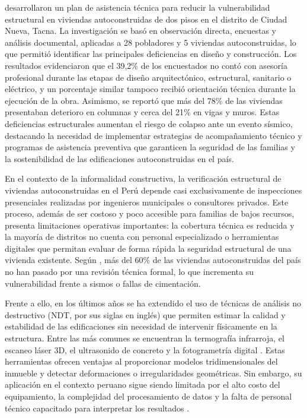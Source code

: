 \documentclass[12pt,oneside]{report}
\begin{document}
\citet{flores2024} desarrollaron un plan de asistencia técnica para reducir la vulnerabilidad estructural en viviendas autoconstruidas de dos pisos en el distrito de Ciudad Nueva, Tacna. La investigación se basó en observación directa, encuestas y análisis documental, aplicadas a 28 pobladores y 5 viviendas autoconstruidas, lo que permitió identificar las principales deficiencias en diseño y construcción. Los resultados evidenciaron que el 39,2\% de los encuestados no contó con asesoría profesional durante las etapas de diseño arquitectónico, estructural, sanitario o eléctrico, y un porcentaje similar tampoco recibió orientación técnica durante la ejecución de la obra. Asimismo, se reportó que más del 78\% de las viviendas presentaban deterioro en columnas y cerca del 21\% en vigas y muros. Estas deficiencias estructurales aumentan el riesgo de colapso ante un evento sísmico, destacando la necesidad de implementar estrategias de acompañamiento técnico y programas de asistencia preventiva que garanticen la seguridad de las familias y la sostenibilidad de las edificaciones autoconstruidas en el país.\par

En el contexto de la informalidad constructiva, la verificación estructural de viviendas autoconstruidas en el Perú depende casi exclusivamente de inspecciones presenciales realizadas por ingenieros municipales o consultores privados. Este proceso, además de ser costoso y poco accesible para familias de bajos recursos, presenta limitaciones operativas importantes: la cobertura técnica es reducida y la mayoría de distritos no cuenta con personal especializado o herramientas digitales que permitan evaluar de forma rápida la seguridad estructural de una vivienda existente. Según \citet{sencico2023}, más del 60\% de las viviendas autoconstruidas del país no han pasado por una revisión técnica formal, lo que incrementa su vulnerabilidad frente a sismos o fallas de cimentación.\par

Frente a ello, en los últimos años se ha extendido el uso de técnicas de análisis no destructivo (NDT, por sus siglas en inglés) que permiten estimar la calidad y estabilidad de las edificaciones sin necesidad de intervenir físicamente en la estructura. Entre las más comunes se encuentran la termografía infrarroja, el escaneo láser 3D, el ultrasonido de concreto y la fotogrametría digital \citep{gao2023}. Estas herramientas ofrecen ventajas al proporcionar modelos tridimensionales del inmueble y detectar deformaciones o irregularidades geométricas. Sin embargo, su aplicación en el contexto peruano sigue siendo limitada por el alto costo del equipamiento, la complejidad del procesamiento de datos y la falta de personal técnico capacitado para interpretar los resultados \citep{flores2024}.\par
\end{document}
